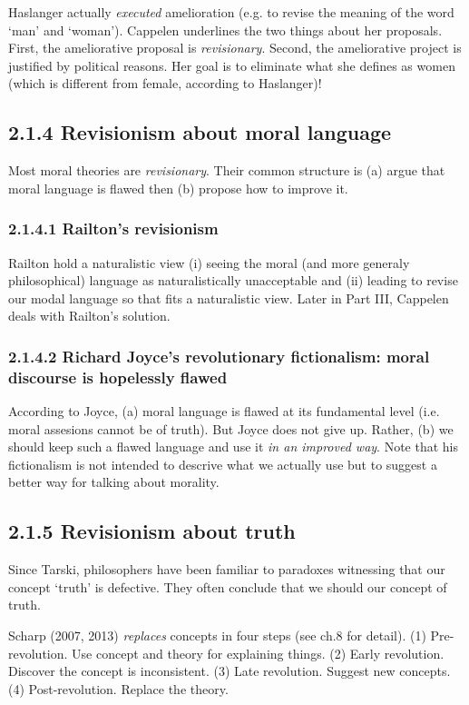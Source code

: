 \documentclass[
10pt, %
a4paper, %
twocolumn, %
landscape %
]{article}
\begin{document}
Haslanger actually \emph{executed} amelioration (e.g. to revise the meaning of the word `man' and `woman').
Cappelen underlines the two things about her proposals.
First, the ameliorative proposal is \emph{revisionary}. Second, the ameliorative project is justified by political reasons. Her goal is to eliminate what she defines as women (which is different from female, according to Haslanger)!


\subsection*{2.1.4 Revisionism about moral language}
Most moral theories are \emph{revisionary}.
Their common structure is (a) argue that moral language is flawed then (b) propose how to improve it.

\subsubsection*{2.1.4.1 Railton's revisionism}
Railton hold a naturalistic view (i) seeing the moral (and more generaly philosophical) language as naturalistically unacceptable and (ii) leading to revise our modal language so that fits a naturalistic view.
Later in Part III, Cappelen deals with Railton's solution.

\subsubsection*{2.1.4.2 Richard Joyce's revolutionary fictionalism: moral discourse is hopelessly flawed}
According to Joyce, (a) moral language is flawed at its fundamental level (i.e. moral assesions cannot be of truth). But Joyce does not give up. Rather, (b) we should keep such a flawed language and use it \emph{in an improved way}.
Note that his fictionalism is not intended to descrive what we actually use but to suggest a better way for talking about morality.

\subsection*{2.1.5 Revisionism about truth}
Since Tarski, philosophers have been familiar to paradoxes witnessing that our concept `truth' is defective. They often conclude that we should our concept of truth.

Scharp (2007, 2013) \emph{replaces} concepts in four steps (see ch.8 for detail).
  (1) Pre-revolution. Use concept and theory for explaining things.
  (2) Early revolution. Discover the concept is inconsistent.
  (3) Late revolution. Suggest new concepts.
  (4) Post-revolution. Replace the theory.
\end{document}
